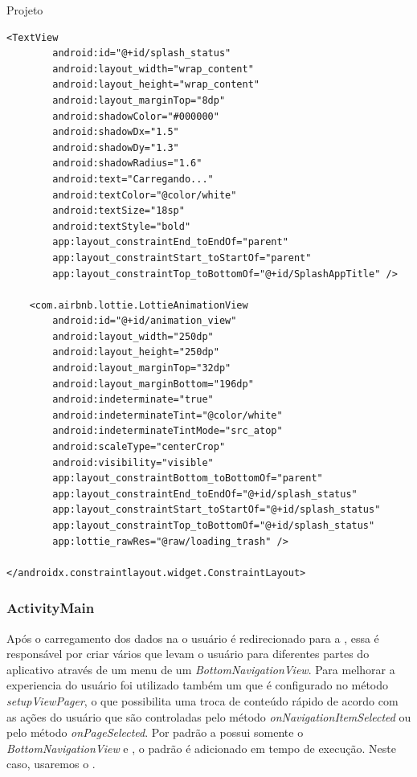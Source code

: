 \documentclass[
	12pt,				%
	openright,			%
	twoside,			%
	a4paper,			%
	english,			%
	french,				%
	spanish,			%
	brazil				%
	]{abntex2}
\begin{document}
\begin{chapter}{Projeto}
\begin{lstlisting}[numbers=none,basicstyle=\small,caption={ActivitySplash.xml}, title={ActivitySplash.xml}, label={activity_splash.xml}]
    <TextView
        android:id="@+id/splash_status"
        android:layout_width="wrap_content"
        android:layout_height="wrap_content"
        android:layout_marginTop="8dp"
        android:shadowColor="#000000"
        android:shadowDx="1.5"
        android:shadowDy="1.3"
        android:shadowRadius="1.6"
        android:text="Carregando..."
        android:textColor="@color/white"
        android:textSize="18sp"
        android:textStyle="bold"
        app:layout_constraintEnd_toEndOf="parent"
        app:layout_constraintStart_toStartOf="parent"
        app:layout_constraintTop_toBottomOf="@+id/SplashAppTitle" />

    <com.airbnb.lottie.LottieAnimationView
        android:id="@+id/animation_view"
        android:layout_width="250dp"
        android:layout_height="250dp"
        android:layout_marginTop="32dp"
        android:layout_marginBottom="196dp"
        android:indeterminate="true"
        android:indeterminateTint="@color/white"
        android:indeterminateTintMode="src_atop"
        android:scaleType="centerCrop"
        android:visibility="visible"
        app:layout_constraintBottom_toBottomOf="parent"
        app:layout_constraintEnd_toEndOf="@+id/splash_status"
        app:layout_constraintStart_toStartOf="@+id/splash_status"
        app:layout_constraintTop_toBottomOf="@+id/splash_status"
        app:lottie_rawRes="@raw/loading_trash" />

</androidx.constraintlayout.widget.ConstraintLayout>
\end{lstlisting}
\subsubsection{ActivityMain} \label{main_activity}
Após o carregamento dos dados na  o usuário é redirecionado para a , essa  é responsável por criar vários  que levam o usuário para diferentes partes do aplicativo através de um menu de um \textit{BottomNavigationView}. Para melhorar a experiencia do usuário foi utilizado também um  que é configurado no método \textit{setupViewPager}, o que possibilita uma troca de conteúdo rápido de acordo com as ações do usuário que são controladas pelo método \textit{onNavigationItemSelected} ou pelo método \textit{onPageSelected}. Por padrão a  possui somente o \textit{BottomNavigationView} e , o  padrão é adicionado em tempo de execução. Neste caso, usaremos o .


\end{chapter}
\end{document}
